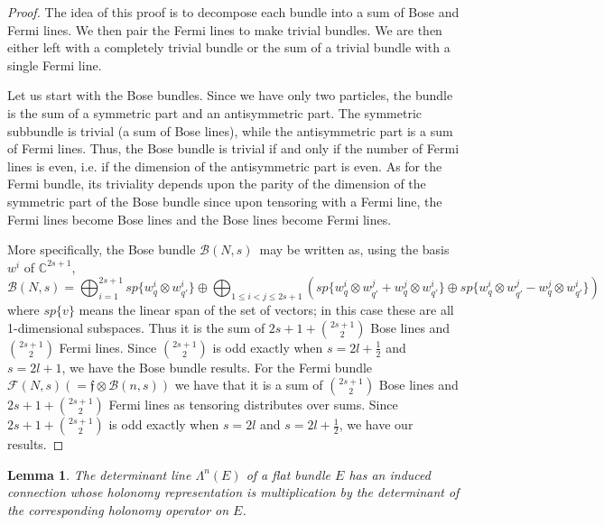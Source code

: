 \documentclass[11pt]{article}
\newtheorem{lemma}{Lemma}
\theoremstyle{remark}
\begin{document}
\begin{proof}
The idea of this proof is to decompose each bundle into a sum of Bose
and Fermi lines. We then pair the Fermi lines to make trivial
bundles. We are then either left with a completely trivial bundle or
the sum of a trivial bundle with a single Fermi line. 

Let us start with the Bose bundles. Since we have only two particles,
the bundle is the sum of a symmetric part and an antisymmetric
part. The symmetric subbundle is trivial (a sum of Bose lines), 
while the antisymmetric part
is a sum of Fermi lines. Thus, the Bose bundle is trivial if and only
if the number of Fermi lines is even, i.e. if the dimension of the 
antisymmetric part is even. 
As for the
Fermi bundle, its triviality depends upon the parity of the dimension of the
symmetric part of the Bose bundle 
since upon tensoring with a Fermi line, the Fermi lines
become Bose lines and the Bose lines become Fermi lines. 

More specifically, the Bose bundle \ensuremath{\mathcal{B}(N, s)}\
 may be written as, using the basis
$\ensuremath{w}^i$ of $\ensuremath{\mathbb{C}}^{2s+1}$,  
\[\ensuremath{\mathcal{B}(N, s)} 
= 
\bigoplus_{i=1}^{2s+1} 
sp\{\ensuremath{w}_{\ensuremath{q}}^i \otimes \ensuremath{w}_{\ensuremath{q}'}^i \} 
\oplus 
\bigoplus_{1 \leq i < j \leq 2s+1} 
(sp\{
\ensuremath{w}_{\ensuremath{q}}^i \otimes \ensuremath{w}_{\ensuremath{q}'}^j
+ 
\ensuremath{w}_{\ensuremath{q}}^j \otimes \ensuremath{w}_{\ensuremath{q}'}^i
\}
\oplus 
sp\{
\ensuremath{w}_{\ensuremath{q}}^i \otimes \ensuremath{w}_{\ensuremath{q}'}^j
-
\ensuremath{w}_{\ensuremath{q}}^j  \otimes \ensuremath{w}_{\ensuremath{q}'}^i
\}) 
\]
where $sp\{v\}$ means the linear span of the set of vectors; in this
case these are all 1-dimensional subspaces.
Thus it is the sum of $2s+1 + \binom{2s+1}{2}$ Bose lines and
$\binom{2s+1}{2}$ Fermi lines. Since $\binom{2s+1}{2}$ is odd exactly
when $s = 2l + \frac{1}{2}$ and $s= 2l+1$, we have the Bose bundle
results.
 For the Fermi bundle
$\ensuremath{\ensuremath{\mathcal{F}}(N,s)} (= \ensuremath{\mathfrak{f}} \otimes \ensuremath{\mathcal{B}(n,s)})$ we have that it is a sum
of 
$\binom{2s+1}{2}$  Bose lines
and $2s+1 + \binom{2s+1}{2}$   Fermi lines as 
tensoring distributes
over sums. Since $2s+1 + \binom{2s+1}{2}$ is odd exactly when $s= 2l$
and  $s=2l+\frac{1}{2}$, we have our results. 
\end{proof}

 
\begin{lemma}
The determinant line $\Lambda^n(E)$ of a flat bundle $E$ 
has an induced connection whose
holonomy representation is  multiplication by the determinant of
the 
corresponding holonomy operator on $E$. 
\end{lemma} 
\end{document}
